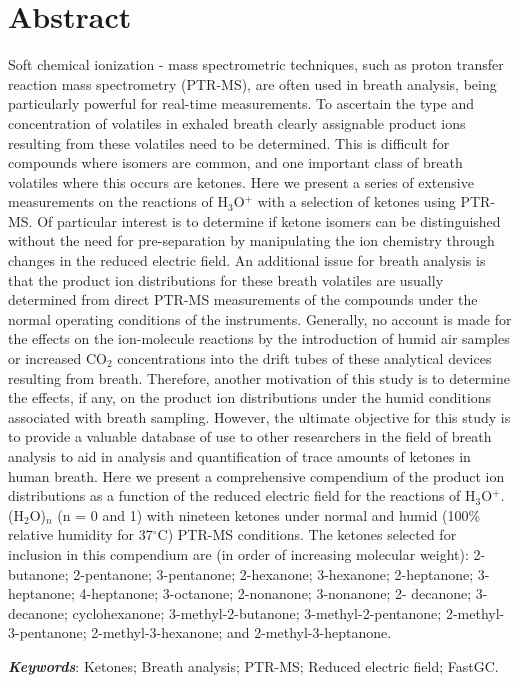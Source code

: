 \section{Abstract}
Soft chemical ionization - mass spectrometric techniques, such as proton transfer reaction mass spectrometry (PTR-MS), are often used in breath analysis, being particularly powerful for real-time measurements. To ascertain the type and concentration of volatiles in exhaled breath clearly assignable product ions resulting from these volatiles need to be determined. This is difficult for compounds where isomers are common, and one important class of breath volatiles where this occurs are ketones. Here we present a series of extensive measurements on the reactions of H$_{3}$O$^+$ with a selection of ketones using PTR-MS. Of particular interest is to determine if ketone isomers can be distinguished without the need for pre-separation by manipulating the ion chemistry through changes in the reduced electric field. An additional issue for breath analysis is that the product ion distributions for these breath volatiles are usually determined from direct PTR-MS measurements of the compounds under the normal operating conditions of the instruments. Generally, no account is made for the effects on the ion-molecule reactions by the introduction of humid air samples or increased CO$_2$ concentrations into the drift tubes of these analytical devices resulting from breath. Therefore, another motivation of this study is to determine the effects, if any, on the product ion distributions under the humid conditions associated with breath sampling. However, the ultimate objective for this study is to provide a valuable database of use to other researchers in the field of breath analysis to aid in analysis and quantification of trace amounts of ketones in human breath. Here we present a comprehensive compendium of the product ion distributions as a function of the reduced electric field for the reactions of H$_{3}$O$^+$. (H$_{2}$O)$_n$ (n = 0 and 1) with nineteen ketones under normal and humid (100\% relative humidity for 37$^{\circ}$C) PTR-MS conditions. The ketones selected for inclusion in this compendium are (in order of increasing molecular weight): 2-butanone; 2-pentanone; 3-pentanone; 2-hexanone; 3-hexanone; 2-heptanone; 3-heptanone; 4-heptanone; 3-octanone; 2-nonanone; 3-nonanone; 2- decanone; 3-decanone; cyclohexanone; 3-methyl-2-butanone; 3-methyl-2-pentanone; 2-methyl-3-pentanone; 2-methyl-3-hexanone; and 2-methyl-3-heptanone.

\textbf{\textit{Keywords}}: Ketones; Breath analysis; PTR-MS; Reduced electric field; FastGC.


